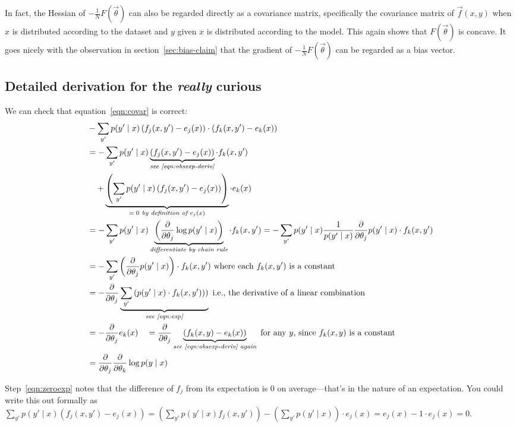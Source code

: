 \documentclass[11pt]{article}
\newcommand{\vtheta}{\vec{\theta}}
\newcommand{\diffk}{\frac{\partial}{\partial \theta_k}}
\newcommand{\diffj}{\frac{\partial}{\partial \theta_j}}
\begin{document}
In fact, the Hessian of $-\frac{1}{N}F(\vtheta)$ can also be regarded
directly as a covariance matrix, specifically the covariance matrix of
$\vec{f}(x,y)$ when $x$ is distributed according to the dataset and
$y$ given $x$ is distributed according to the model.  This again
shows that $F(\vec{\theta})$ is concave.  It goes nicely with the 
observation in section~\ref{sec:bias-claim} that the gradient of
$-\frac{1}{N}F(\vtheta)$ can be regarded as a bias vector.


\subsection{Detailed derivation for the \emph{really} curious}

We can check that equation~\eqref{eqn:covar} is correct:
\begin{align}
 & -\sum_{y'} p(y' \mid x) \left( f_j(x,y') - e_j(x) \right) \cdot \left( f_k(x,y') - e_k(x) \right) \\
 &= - \sum_{y'} p(y' \mid x) \underbrace{\left( f_j(x,y') - e_j(x)
   \right)}_{\textit{see \eqref{eqn:obsexp-deriv}}} \cdot f_k(x,y')
   \nonumber \\
 &\quad  + \underbrace{\left( \sum_{y'} p(y' \mid x) \left( f_j(x,y') - e_j(x) \right) \right)}_{\textit{$= 0$ by definition of $e_j(x)$}} \cdot e_k(x) \label{eqn:zeroexp}\\
 &= - \sum_{y'} p(y' \mid x) \underbrace{\left( \diffj \log p(y' \mid
   x) \right)}_{\textit{differentiate by chain rule}} \cdot f_k(x,y')
   = - \sum_{y'} p(y' \mid x) \frac{1}{p(y' \mid x)} \diffj p(y' \mid
   x) \cdot f_k(x,y') 
   \raisetag{12pt} \label{eqn:logderivative} \\
 &= - \sum_{y'} \left( \diffj p(y' \mid x) \right) \cdot f_k(x,y') \text{ where each $f_k(x,y')$ is a constant}\\
 &= - \diffj \underbrace{\sum_{y'} \left( p(y' \mid x) \cdot
   f_k(x,y')) \right)}_{\textit{see \eqref{eqn:exp}}} \text{ i.e., the derivative of a linear combination} \\
 &= - \diffj e_k(x) 
   \quad = \diffj\underbrace{(f_k(x,y) - e_k(x))}_{\textit{see
   \eqref{eqn:obsexp-deriv} again}} \text{ for any $y$, since $f_k(x,y)$ is a constant} \\
 &= \diffj \diffk \log p(y \mid x) 
\end{align}

Step~\eqref{eqn:zeroexp} notes that the difference of $f_j$
from its expectation is 0 on average---that's in the nature of an
expectation.  You could write this out formally
as $\sum_{y'} p(y' \mid x) \left( f_j(x,y') - e_j(x) \right) =
\left( \sum_{y'} p(y' \mid x) f_j(x,y') \right) - \left( \sum_{y'}
  p(y' \mid x) \right) \cdot e_j(x) = e_j(x) - 1 \cdot e_j(x) = 0$.
\end{document}
